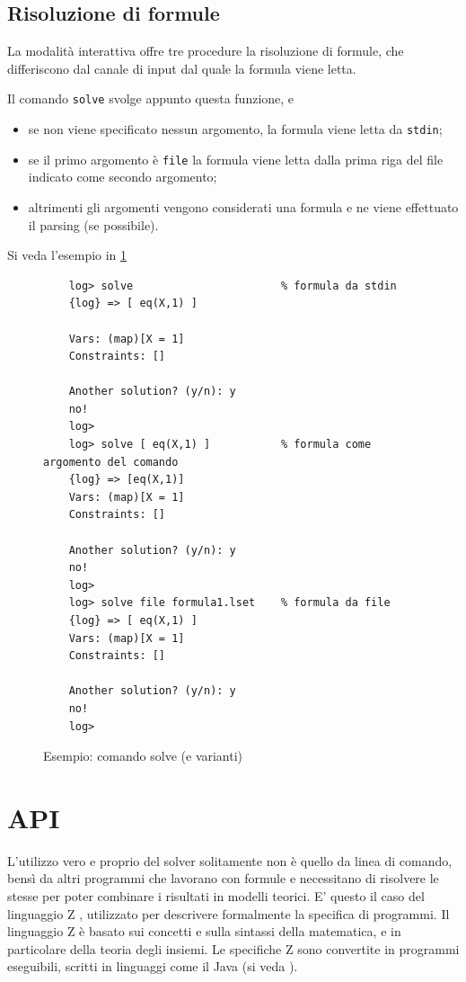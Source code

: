 \documentclass[12pt,a4paper,openright]{book} %
\begin{document}
\subsection{Risoluzione di formule}

La modalità interattiva offre tre procedure la risoluzione di formule,
che differiscono dal canale di input dal quale la formula viene letta.

Il comando \texttt{solve} svolge appunto questa funzione, e
\begin{itemize}
	\item se non viene specificato nessun argomento, la formula
          viene letta da \texttt{stdin};
	\item se il primo argomento è \texttt{file} la formula viene
          letta dalla prima riga del file indicato come secondo
          argomento;
	\item altrimenti gli argomenti vengono considerati una formula
          e ne viene effettuato il parsing (se possibile).
\end{itemize}

Si veda l'esempio in \ref{fig:example_solvecommands}

\begin{figure}
	\begin{verbatim}
	log> solve                       % formula da stdin
	{log} => [ eq(X,1) ]

	Vars: (map)[X = 1]
	Constraints: []

	Another solution? (y/n): y
	no!
	log>
	log> solve [ eq(X,1) ]           % formula come argomento del comando
	{log} => [eq(X,1)]
	Vars: (map)[X = 1]
	Constraints: []

	Another solution? (y/n): y
	no!
	log>
	log> solve file formula1.lset    % formula da file
	{log} => [ eq(X,1) ]
	Vars: (map)[X = 1]
	Constraints: []

	Another solution? (y/n): y
	no!
	log>
	\end{verbatim}
	\caption{Esempio: comando solve (e varianti)}
	\label{fig:example_solvecommands}
\end{figure}

\section{API}
\label{sec:use_api}

L'utilizzo vero e proprio del solver solitamente non è quello da linea
di comando, bensì da altri programmi che lavorano con formule e
necessitano di risolvere le stesse per poter combinare i risultati in
modelli teorici. E' questo il caso del linguaggio Z \cite{Cristia16},
utilizzato per descrivere formalmente la specifica di programmi. Il
linguaggio Z è basato sui concetti e sulla sintassi della matematica,
e in particolare della teoria degli insiemi. Le specifiche Z sono
convertite in programmi eseguibili, scritti in linguaggi come il Java
(si veda \cite{DeSantis17}).
\end{document}
